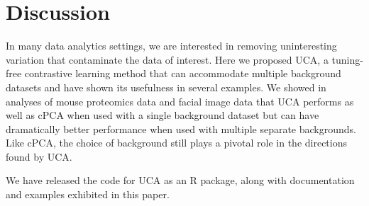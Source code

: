 \documentclass[12pt]{article}
\begin{document}
\section{Discussion}
In many data analytics settings, we are interested in removing uninteresting variation that contaminate the data of interest.
Here we proposed UCA, a tuning-free contrastive learning method that can accommodate multiple background datasets and have shown its usefulness in several examples. %
We showed in analyses of mouse proteomics data and facial image data that UCA performs as well as cPCA when used with a single background dataset but can have dramatically better performance when used with multiple separate backgrounds.%
Like cPCA, the choice of background still plays a pivotal role in the directions found by UCA. 

We have released the code for UCA as an R package, along with documentation and examples exhibited in this paper. 
\end{document}

